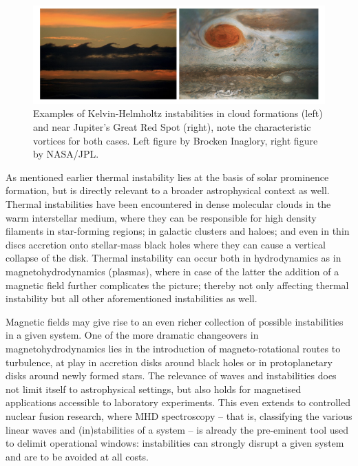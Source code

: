 \begin{figure}[b]
  \centering
  \includegraphics[width=\textwidth]{instabilities.png}
  \caption{
    Examples of Kelvin-Helmholtz instabilities in cloud formations (left) and near Jupiter's Great Red Spot (right), note the characteristic vortices for both cases. Left figure by Brocken Inaglory, right figure by NASA/JPL.
  }
  \label{fig: kh_instability}
\end{figure}

As mentioned earlier thermal instability lies at the basis of solar prominence formation, but is directly relevant to a broader astrophysical context as well. Thermal instabilities have been encountered in dense molecular clouds in the warm interstellar medium, where they can be responsible for high density filaments in star-forming regions; in galactic clusters and haloes; and even in thin discs accretion onto stellar-mass black holes where they can cause a vertical collapse of the disk. Thermal instability can occur both in hydrodynamics as in magnetohydrodynamics (plasmas), where in case of the latter the addition of a magnetic field further complicates the picture; thereby not only affecting thermal instability but all other aforementioned instabilities as well.

Magnetic fields may give rise to an even richer collection of possible instabilities in a given system. One of the more dramatic changeovers in magnetohydrodynamics lies in the introduction of magneto-rotational routes to turbulence, at play in accretion disks around black holes or in protoplanetary disks around newly formed stars. The relevance of waves and instabilities does not limit itself to astrophysical settings, but also holds for magnetised applications accessible to laboratory experiments. This even extends to controlled nuclear fusion research, where MHD spectroscopy -- that is, classifying the various linear waves and (in)stabilities of a system -- is already the pre-eminent tool used to delimit operational windows: instabilities can strongly disrupt a given system and are to be avoided at all costs.


